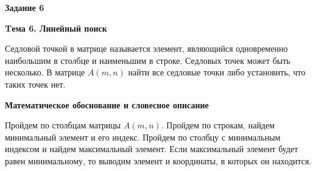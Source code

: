 \documentclass[12pt, a4paper]{article}
\begin{document}
		\newpage
		\begin{flushleft}
			\newpage
			{\textbf{Задание 6}}\par
			{\textbf{Tема 6. Линейный поиск}}\par
			{Седловой точкой в матрице называется элемент, являющийся
			одновременно наибольшим в столбце и наименьшим в строке. Седловых 
			точек может быть несколько. В матрице $A(m,n)$ найти все седловые
			точки либо установить, что таких точек нет.}\par
			{\textbf{Математическое обоснование и словесное описание}\par
			Пройдем по столбцам матрицы $A(m,n)$. Пройдем по строкам, найдем минимальный элемент и
			его индекс. Пройдем по столбцу с минимальным индексом и найдем максимальный элемент.
			Если максимальный элемент будет равен минимальному, то выводим элемент
			и координаты, в которых он находится.
			}\par

		\end{flushleft}
		\newpage
\end{document}
